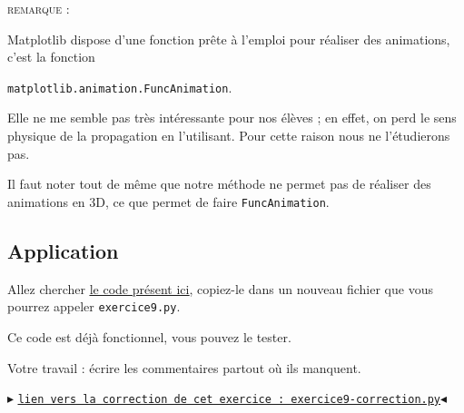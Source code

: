 \documentclass[11pt]{article}
\begin{document}
\bigskip


\textsc{remarque : }

Matplotlib dispose d'une fonction prête à l'emploi pour réaliser des animations, c'est la fonction 

\texttt{matplotlib.animation.FuncAnimation}.

Elle ne me semble pas très intéressante pour nos élèves ; en effet, on perd le sens physique de la propagation en l'utilisant. Pour cette raison nous ne l'étudierons pas.

Il faut noter tout de même que notre méthode ne permet pas de réaliser des animations en 3D, ce que permet de faire \texttt{FuncAnimation}.










\subsection{Application}

Allez chercher  \href{https://github.com/formationPythonPC-Juin/aides-formation/blob/master/exercice9-aide.py}{\underline{le code présent ici}}, copiez-le dans un nouveau fichier que vous pourrez appeler \texttt{exercice9.py}.

\medskip
Ce code est déjà fonctionnel, vous pouvez le tester.

\medskip
Votre travail : écrire les commentaires partout où ils manquent.




\bigskip






\begin{center}
$\blacktriangleright$ \href{https://github.com/formationPythonPC-Juin/corrections-formation/blob/master/exercice9-correction.py}{\underline{\texttt{lien vers la correction de cet exercice : exercice9-correction.py}}}$\blacktriangleleft$                                                                                                                                                                    \end{center}










\newpage




 
 
 
\end{document}
